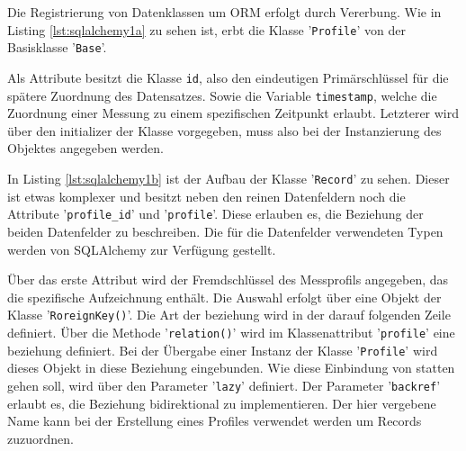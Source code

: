    
    Die Registrierung von Datenklassen um ORM erfolgt durch Vererbung. Wie in Listing \ref{lst:sqlalchemy1a} zu sehen ist, erbt die Klasse '\texttt{Profile}' von der Basisklasse '\texttt{Base}'.
    
    Als Attribute besitzt die Klasse \texttt{id}, also den eindeutigen Primärschlüssel für die spätere Zuordnung des Datensatzes. Sowie die Variable \texttt{timestamp}, welche die Zuordnung einer Messung zu einem spezifischen Zeitpunkt erlaubt. Letzterer wird über den initializer der Klasse vorgegeben, muss also bei der Instanzierung des Objektes angegeben werden.
    
    
    
    In Listing \ref{lst:sqlalchemy1b} ist der Aufbau der Klasse '\texttt{Record}' zu sehen. Dieser ist etwas komplexer und besitzt neben den reinen Datenfeldern noch die Attribute '\texttt{profile\_id}' und '\texttt{profile}'. Diese erlauben es, die Beziehung der beiden Datenfelder zu beschreiben. Die für die Datenfelder verwendeten Typen werden von SQLAlchemy zur Verfügung gestellt.
    
    Über das erste Attribut wird der Fremdschlüssel des Messprofils angegeben, das die spezifische Aufzeichnung enthält. Die Auswahl erfolgt über eine Objekt der Klasse '\texttt{RoreignKey()}'. Die Art der beziehung wird in der darauf folgenden Zeile definiert. Über die Methode '\texttt{relation()}' wird im Klassenattribut '\texttt{profile}' eine beziehung definiert. Bei der Übergabe einer Instanz der Klasse '\texttt{Profile}' wird dieses Objekt in diese Beziehung eingebunden. Wie diese Einbindung von statten gehen soll, wird über den Parameter '\texttt{lazy}' definiert. Der Parameter '\texttt{backref}' erlaubt es, die Beziehung bidirektional zu implementieren. Der hier vergebene Name kann bei der Erstellung eines Profiles verwendet werden um Records zuzuordnen.
    
    
